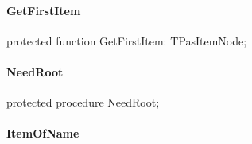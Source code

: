 \documentclass{report}
\newif\ifpdf
\begin{document}
\paragraph*{GetFirstItem}\hspace*{\fill}

\label{PasDoc_HierarchyTree.TStringCardinalTree-GetFirstItem}
\begin{list}{}{
\setlength{\itemindent}{0cm}
\setlength{\listparindent}{0cm}
\setlength{\leftmargin}{\evensidemargin}
\addtolength{\leftmargin}{\tmplength}
\settowidth{\labelsep}{X}
\addtolength{\leftmargin}{\labelsep}
\setlength{\labelwidth}{\tmplength}
}
\item[\textbf{Declaration}\hfill]
\ifpdf
\begin{flushleft}
\fi
\begin{ttfamily}
protected function GetFirstItem: TPasItemNode;\end{ttfamily}

\ifpdf
\end{flushleft}
\fi

\end{list}
\paragraph*{NeedRoot}\hspace*{\fill}

\label{PasDoc_HierarchyTree.TStringCardinalTree-NeedRoot}
\begin{list}{}{
\setlength{\itemindent}{0cm}
\setlength{\listparindent}{0cm}
\setlength{\leftmargin}{\evensidemargin}
\addtolength{\leftmargin}{\tmplength}
\settowidth{\labelsep}{X}
\addtolength{\leftmargin}{\labelsep}
\setlength{\labelwidth}{\tmplength}
}
\item[\textbf{Declaration}\hfill]
\ifpdf
\begin{flushleft}
\fi
\begin{ttfamily}
protected procedure NeedRoot;\end{ttfamily}

\ifpdf
\end{flushleft}
\fi

\end{list}
\paragraph*{ItemOfName}\hspace*{\fill}
\end{document}
